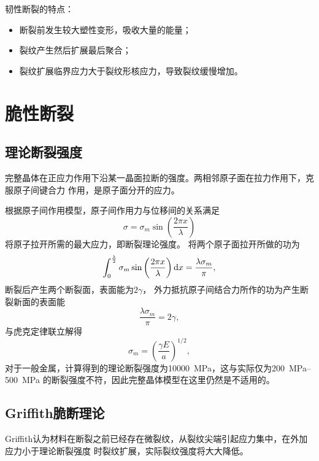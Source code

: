             韧性断裂的特点：
            \begin{itemize}
                \item 断裂前发生较大塑性变形，吸收大量的能量；
                \item 裂纹产生然后扩展最后聚合；
                \item 裂纹扩展临界应力大于裂纹形核应力，导致裂纹缓慢增加。
            \end{itemize}
    \section{脆性断裂}
        \subsection{理论断裂强度}
            完整晶体在正应力作用下沿某一晶面拉断的强度。两相邻原子面在拉力作用下，克服原子间键合力
            作用，是原子面分开的应力。

            根据原子间作用模型，原子间作用力与位移间的关系满足
            \begin{equation}
                \sigma=\sigma_{m}\sin\left( \frac{2\pi x}{\lambda} \right)
            \end{equation}
            将原子拉开所需的最大应力，即断裂理论强度。
            将两个原子面拉开所做的功为
            \begin{equation}
                \int_{0}^{\frac{\lambda}{2}}\sigma_m\sin\left( \frac{2\pi x}{\lambda} \right)\mathop{}\!\mathrm{d} x=\frac{\lambda\sigma_m}{\pi},
            \end{equation}
            断裂后产生两个断裂面，表面能为$2\gamma$，
            外力抵抗原子间结合力所作的功为产生断裂新面的表面能
            \begin{equation}
                \frac{\lambda\sigma_m}{\pi}=2\gamma,
            \end{equation}
            与虎克定律联立解得
            \begin{equation}
                \sigma_m=\left( \frac{\gamma E}{a} \right)^{1/2},
            \end{equation}
            对于一般金属，计算得到的理论断裂强度为\SI{10000}{\MPa}，这与实际仅为\SIrange{200}{500}{\MPa}
            的断裂强度不符，因此完整晶体模型在这里仍然是不适用的。
        \subsection{Griffith脆断理论}
            Griffith认为材料在断裂之前已经存在微裂纹，从裂纹尖端引起应力集中，在外加应力小于理论断裂强度
            时裂纹扩展，实际裂纹强度将大大降低。

